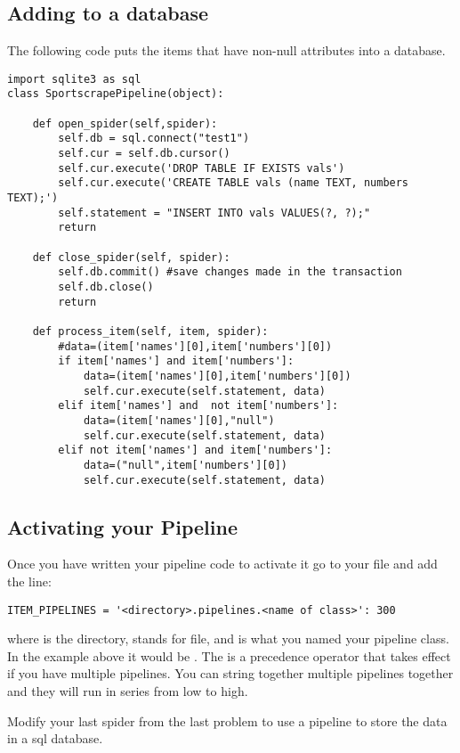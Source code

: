 \subsection*{Adding to a database}
The following code puts the items that have non-null attributes into a database. 
\begin{lstlisting}
import sqlite3 as sql
class SportscrapePipeline(object):
	
	def open_spider(self,spider):
		self.db = sql.connect("test1")
		self.cur = self.db.cursor()
		self.cur.execute('DROP TABLE IF EXISTS vals')
		self.cur.execute('CREATE TABLE vals (name TEXT, numbers TEXT);')
		self.statement = "INSERT INTO vals VALUES(?, ?);"
		return

	def close_spider(self, spider):
		self.db.commit() #save changes made in the transaction
		self.db.close()
		return

	def process_item(self, item, spider):
		#data=(item['names'][0],item['numbers'][0])
		if item['names'] and item['numbers']:
			data=(item['names'][0],item['numbers'][0])
			self.cur.execute(self.statement, data)
		elif item['names'] and  not item['numbers']:
			data=(item['names'][0],"null")
			self.cur.execute(self.statement, data)
		elif not item['names'] and item['numbers']:
			data=("null",item['numbers'][0])
			self.cur.execute(self.statement, data)
\end{lstlisting}

\subsection*{Activating your Pipeline}
Once you have written your pipeline code to activate it go to your  file and add the line:
\begin{lstlisting}
ITEM_PIPELINES = '<directory>.pipelines.<name of class>': 300
\end{lstlisting}
where  is the directory,  stands for  file, and  is what you named your pipeline class.
In the example above it would be .
The  is a precedence operator that takes effect if you have multiple pipelines.
You can string together multiple pipelines together and they will run in series from low to high.

\begin{problem}
Modify your last spider from the last problem to use a pipeline to store the data in a sql database.
\end{problem}

